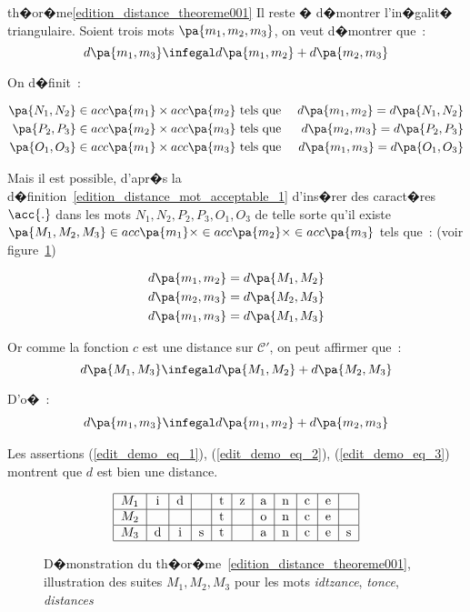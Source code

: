 \begin{xdemomine}{th�or�me}{\ref{edition_distance_theoreme001}}
Il reste � d�montrer l'in�galit� triangulaire. Soient trois mots $\pa{m_1,m_2,m_3}$, on veut d�montrer que~:
    $$
    d\pa{m_1,m_3} \infegal d\pa{m_1,m_2} + d \pa{m_2,m_3}
    $$

On d�finit~:

    \begin{eqnarray*}
    \pa{N_1,N_2} \in acc\pa{m_1} \times acc\pa{m_2}    & \text{ tels que }     &  d\pa{m_1,m_2} = d\pa{N_1,N_2} \\
    \pa{P_2,P_3} \in acc\pa{m_2} \times acc\pa{m_3}    & \text{ tels que }     &  d\pa{m_2,m_3} = d\pa{P_2,P_3} \\
    \pa{O_1,O_3} \in acc\pa{m_1} \times acc\pa{m_3}    & \text{ tels que }     &  d\pa{m_1,m_3} = d\pa{O_1,O_3}
    \end{eqnarray*}

Mais il est possible, d'apr�s la d�finition~\ref{edition_distance_mot_acceptable_1} d'ins�rer des caract�res $\acc{.}$
dans les mots $N_1,N_2,P_2,P_3,O_1,O_3$ de telle sorte qu'il existe $\pa{M_1,M_2,M_3} \in acc\pa{m_1} \times \in
acc\pa{m_2} \times \in acc\pa{m_3}$ tels que~: (voir figure~\ref{edition_distance_demonstration})

    \begin{eqnarray*}
    d\pa{m_1,m_2} = d\pa{M_1,M_2} \\
    d\pa{m_2,m_3} = d\pa{M_2,M_3} \\
    d\pa{m_1,m_3} = d\pa{M_1,M_3}
    \end{eqnarray*}

Or comme la fonction $c$ est une distance sur $\mathcal{C}'$, on peut affirmer que~:
    $$
    d\pa{M_1,M_3} \infegal d\pa{M_1,M_2} + d \pa{M_2,M_3}
    $$

D'o�~:
    \begin{eqnarray}
    d\pa{m_1,m_3} \infegal d\pa{m_1,m_2} + d \pa{m_2,m_3} \label{edit_demo_eq_3}
    \end{eqnarray}

Les assertions (\ref{edit_demo_eq_1}), (\ref{edit_demo_eq_2}), (\ref{edit_demo_eq_3}) montrent que $d$ est bien une
distance.



    \begin{figure}[ht]
    \[
    \begin{tabular}{|c|c|c|c|c|c|c|c|c|c|c|} \hline
    $M_1$ & i & d &   & t & z & a & n & c & e & \\ \hline
    $M_2$ &   &   &   & t &   & o & n & c & e & \\ \hline
    $M_3$ & d & i & s & t &   & a & n & c & e & s \\ \hline
    \end{tabular}
    \]
    \caption{D�monstration du th�or�me~\ref{edition_distance_theoreme001}, illustration des suites $M_1,M_2,M_3$ pour les mots
                \textit{idtzance}, \textit{tonce}, \textit{distances}}
    \label{edition_distance_demonstration}
    \end{figure}


\end{xdemomine}








